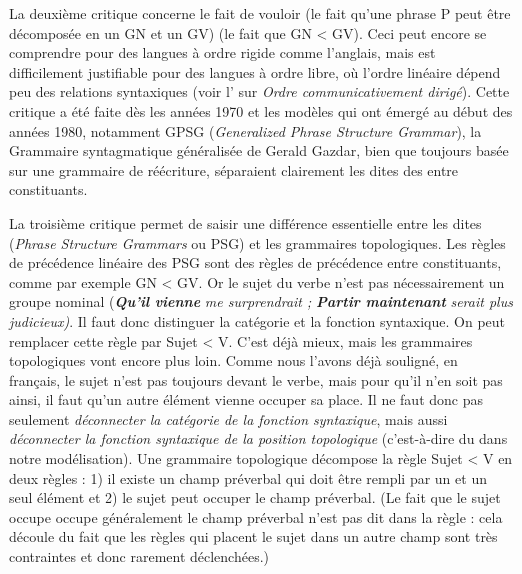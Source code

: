 {    La deuxième critique concerne le fait de vouloir  (le fait qu’une phrase P peut être décomposée en un GN et un GV)  (le fait que GN < GV). Ceci peut encore se comprendre pour des langues à ordre rigide comme l’anglais, mais est difficilement justifiable pour des langues à ordre libre, où l’ordre linéaire dépend peu des relations syntaxiques (voir l’ sur \textit{Ordre communicativement dirigé}). Cette critique a été faite dès les années 1970 et les modèles qui ont émergé au début des années 1980, notamment GPSG (\textit{Generalized Phrase Structure Grammar}), la Grammaire syntagmatique généralisée de Gerald Gazdar, bien que toujours basée sur une grammaire de réécriture, séparaient clairement les  dites  des  entre constituants.

    La troisième critique permet de saisir une différence essentielle entre les  dites  (\textit{Phrase Structure Grammars} ou PSG) et les grammaires topologiques. Les règles de précédence linéaire des PSG sont des règles de précédence entre constituants, comme par exemple GN < GV. Or le sujet du verbe n’est pas nécessairement un groupe nominal (\textbf{\textit{Qu’il} \textit{vienne}} \textit{me surprendrait ;} \textbf{\textit{Partir maintenant}} \textit{serait plus judicieux)}. Il faut donc distinguer la catégorie et la fonction syntaxique. On peut remplacer cette règle par Sujet < V. C’est déjà mieux, mais les grammaires topologiques vont encore plus loin. Comme nous l’avons déjà souligné, en français, le sujet n’est pas toujours devant le verbe, mais pour qu’il n’en soit pas ainsi, il faut qu’un autre élément vienne occuper sa place. Il ne faut donc pas seulement \textit{{déconnecter} la catégorie de la fonction syntaxique}, mais aussi \textit{déconnecter la {fonction syntaxique} de la position topologique} (c'est-à-dire du  dans notre modélisation). Une grammaire topologique décompose la règle Sujet < V en deux règles : 1) il existe un champ préverbal qui doit être rempli par un et un seul élément et 2) le sujet peut occuper le champ préverbal. (Le fait que le sujet occupe occupe généralement le champ préverbal n'est pas dit dans la règle : cela découle du fait que les règles qui placent le sujet dans un autre champ sont très contraintes et donc rarement déclenchées.)
}
